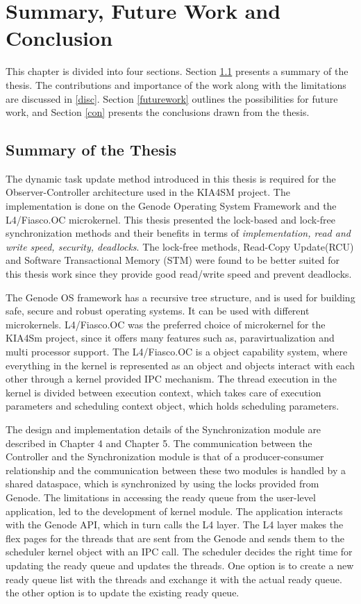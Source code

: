 \chapter{Summary, Future Work and Conclusion}

This chapter is divided into four sections. Section \ref{summary} presents a summary of the thesis. The contributions and importance of the work along with the limitations are discussed in \ref{disc}. Section \ref{futurework} outlines the possibilities for future work, and Section \ref{con} presents the conclusions drawn from the thesis.

\section{Summary of the Thesis} \label{summary}
The dynamic task update method introduced in this thesis is required for the Observer-Controller architecture used in the KIA4SM project. The implementation is done on the Genode Operating System Framework and the L4/Fiasco.OC microkernel. This thesis presented the lock-based and lock-free synchronization methods and their benefits in terms of \textit{implementation, read and write speed, security, deadlocks}. The lock-free methods, Read-Copy Update(RCU) and Software Transactional Memory (STM) were found to be better suited for this thesis work since they provide good read/write speed and prevent deadlocks.

The Genode OS framework has a recursive tree structure, and is used for building safe, secure and robust operating systems. It can be used with different microkernels. L4/Fiasco.OC was the preferred choice of microkernel for the KIA4Sm project, since it offers many features such as, paravirtualization and multi processor support. The L4/Fiasco.OC is a object capability system, where everything in the kernel is represented as an object and objects interact with each other through a kernel provided IPC mechanism. The thread execution in the kernel is divided between execution context, which takes care of execution parameters and scheduling context object, which holds scheduling parameters.

The design and implementation details of the Synchronization module are described in Chapter 4 and Chapter 5. The communication between the Controller and the Synchronization module is that of a producer-consumer relationship and the communication between these two modules is handled by a shared dataspace, which is synchronized by using the locks provided from Genode. The limitations in accessing the ready queue from the user-level application, led to the development of kernel module. The application interacts with the Genode API, which in turn calls the L4 layer. The L4 layer makes the flex pages for the threads that are sent from the Genode and sends them to the scheduler kernel object with an IPC call. The scheduler decides the right time for updating the ready queue and updates the threads. One option is to create a new ready queue list with the threads and exchange it with the actual ready queue. the other option is to update the existing ready queue.


